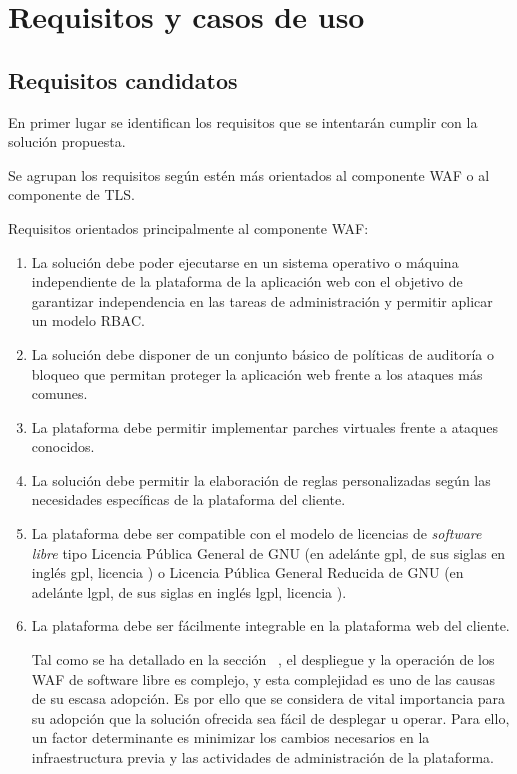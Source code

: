\chapter{Requisitos y casos de uso}
\section{Requisitos candidatos}
\par En primer lugar se identifican los requisitos que se intentarán cumplir con la solución propuesta.
\par Se agrupan los requisitos según estén más orientados al componente WAF o al componente de TLS.
\par Requisitos orientados principalmente al componente WAF:
\begin{enumerate}
  \item \label{req:independence} La solución debe poder ejecutarse en un sistema operativo o máquina independiente de la plataforma de la aplicación web con el
    objetivo de garantizar independencia en las tareas de administración y permitir aplicar un modelo RBAC.

  \item \label{req:commonattacks} La solución debe disponer de un conjunto básico de políticas de auditoría o bloqueo que permitan proteger la aplicación web
    frente a los ataques más comunes.

  \item La plataforma debe permitir implementar parches virtuales frente a ataques conocidos.

  \item La solución debe permitir la elaboración de reglas personalizadas según las necesidades específicas de la plataforma del cliente.

  \item \label{req:softwarelibre} La plataforma debe ser compatible con el modelo de licencias de {\em software libre\cite{softwarelibre}} tipo Licencia Pública
    General de GNU (en adelánte \acrshort{gpl}, de  sus siglas en inglés \acrlong{gpl}, licencia \cite{gpl}) o Licencia Pública General Reducida de GNU (en adelánte \acrshort{lgpl},
    de sus siglas en inglés \acrlong{lgpl}, licencia \cite{lgpl}).

  \item \label{req:facilidad} La plataforma debe ser fácilmente integrable en la plataforma web del cliente.
    \par Tal como se ha detallado en la sección ~, el despliegue y la operación de los WAF de software libre es complejo, y esta complejidad es uno de las causas de su escasa adopción. Es por ello que se considera de
    vital importancia para su adopción que la solución ofrecida sea fácil de desplegar u operar. Para ello, un factor determinante es minimizar los cambios necesarios en la infraestructura previa y  las actividades de administración de la
    plataforma.


\end{enumerate}
